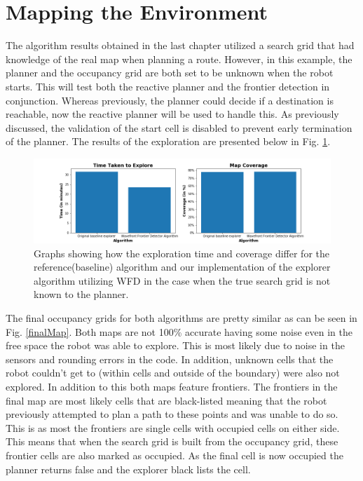 \documentclass[a4paper,12pt]{article}
\begin{document}
	
	
	\section{Mapping the Environment}
		The algorithm results obtained in the last chapter utilized a search grid that had knowledge of the real map when planning a route. However, in this example, the planner and the occupancy grid are both set to be unknown when the robot starts. This will test both the reactive planner and the frontier detection in conjunction. Whereas previously, the planner could decide if a destination is reachable, now the reactive planner will be used to handle this. As previously discussed, the validation of the start cell is disabled to prevent early termination of the planner. The results of the exploration are presented below in Fig. \ref{Part3}. 

		\begin{figure}[H]
			\centering
			\includegraphics[scale=0.5]{images/Part3.png}
			\caption{Graphs showing how the exploration time and coverage differ for the reference(baseline) algorithm and our implementation of the explorer algorithm utilizing WFD in the case when the true search grid is not known to the planner.}
			\label{Part3}
		\end{figure}

		The final occupancy grids for both algorithms are pretty similar as can be seen in Fig. \ref{finalMap}. Both maps are not 100\% accurate having some noise even in the free space the robot was able to explore. This is most likely due to noise in the sensors and rounding errors in the code. In addition, unknown cells that the robot couldn't get to (within cells and outside of the boundary) were also not explored. In addition to this both maps feature frontiers. The frontiers in the final map are most likely cells that are black-listed meaning that the robot previously attempted to plan a path to these points and was unable to do so. This is as most the frontiers are single cells with occupied cells on either side. This means that when the search grid is built from the occupancy grid, these frontier cells are also marked as occupied. As the final cell is now occupied the planner returns false and the explorer black lists the cell.
\end{document}
